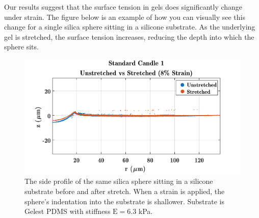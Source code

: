 Our results suggest that the surface tension in gels does significantly change under strain. The figure below is an example of how you can visually see this change for a single silica sphere sitting in a silicone substrate. As the underlying gel is stretched, the surface tension increases, reducing the depth into which the sphere sits. 
\begin{figure}[h!]
	\centering
	\includegraphics[width=\linewidth]{Chapters/Figures/sc1_unstretched_v_8ml}
	\caption[Side Collapse Comparison]{The side profile of the same silica sphere sitting in a silicone substrate before and after stretch. When a strain is applied, the sphere's indentation into the substrate is shallower. Substrate is Gelest PDMS with stiffness $\text{E}=6.3$ kPa.}	
	\label{fig:sc1unstretchedv8ml}
\end{figure}




